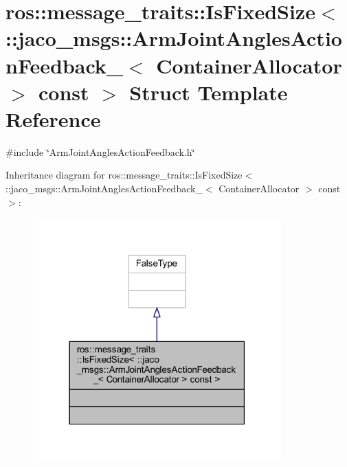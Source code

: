 \hypertarget{structros_1_1message__traits_1_1IsFixedSize_3_01_1_1jaco__msgs_1_1ArmJointAnglesActionFeedback__a6106dd883560e6c940667811df6f91d}{}\section{ros\+:\+:message\+\_\+traits\+:\+:Is\+Fixed\+Size$<$ \+:\+:jaco\+\_\+msgs\+:\+:Arm\+Joint\+Angles\+Action\+Feedback\+\_\+$<$ Container\+Allocator $>$ const $>$ Struct Template Reference}
\label{structros_1_1message__traits_1_1IsFixedSize_3_01_1_1jaco__msgs_1_1ArmJointAnglesActionFeedback__a6106dd883560e6c940667811df6f91d}


{\ttfamily \#include \char`\"{}Arm\+Joint\+Angles\+Action\+Feedback.\+h\char`\"{}}



Inheritance diagram for ros\+:\+:message\+\_\+traits\+:\+:Is\+Fixed\+Size$<$ \+:\+:jaco\+\_\+msgs\+:\+:Arm\+Joint\+Angles\+Action\+Feedback\+\_\+$<$ Container\+Allocator $>$ const $>$\+:
\nopagebreak
\begin{figure}[H]
\begin{center}
\leavevmode
\includegraphics[width=271pt]{dc/def/structros_1_1message__traits_1_1IsFixedSize_3_01_1_1jaco__msgs_1_1ArmJointAnglesActionFeedback__0c79d82066e09389bfe6ee7051df4171}
\end{center}
\end{figure}


